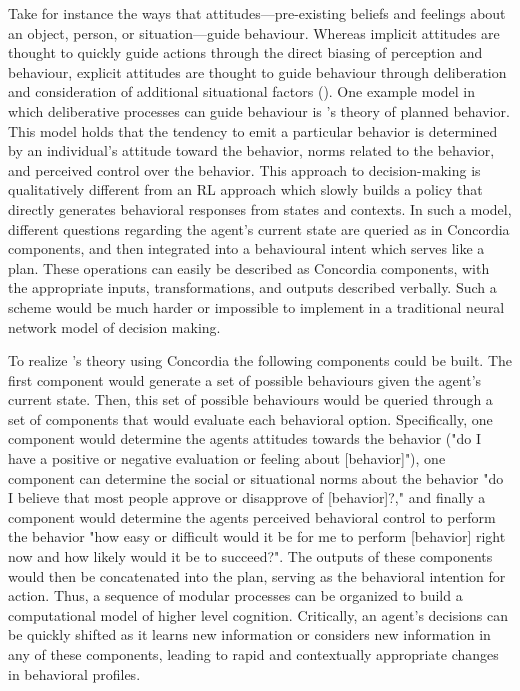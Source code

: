 \documentclass[11pt, a4paper, logo, twocolumn, internal, copyright, numbering]{googledeepmind}
\begin{document}
Take for instance the ways that attitudes---pre-existing beliefs and feelings about an object, person, or situation---guide behaviour. Whereas implicit attitudes are thought to quickly guide actions through the direct biasing of perception and behaviour, explicit attitudes are thought to guide behaviour through deliberation and consideration of additional situational factors (\cite{fazio1990multiple, gawronski2011associative, olson2008implicit}). One example model in which deliberative processes can guide behaviour is \cite{ajzen1991theory}'s theory of planned behavior. This model holds that the tendency to emit a particular behavior is determined by an individual's attitude toward the behavior, norms related to the behavior, and perceived control over the behavior. This approach to decision-making is qualitatively different from an RL approach which slowly builds a policy that directly generates behavioral responses from states and contexts. In such a model, different questions regarding the agent's current state are queried as in Concordia components, and then integrated into a behavioural intent which serves like a plan. These operations can easily be described as Concordia components, with the appropriate inputs, transformations, and outputs described verbally. Such a scheme would be much harder or impossible to implement in a traditional neural network model of decision making. 


To realize \cite{ajzen1991theory}'s theory using Concordia the following components could be built. The first component would generate a set of possible behaviours given the agent's current state. Then, this set of possible behaviours would be queried through a set of components that would evaluate each behavioral option. Specifically, one component would determine the agents attitudes towards the behavior ("do I have a positive or negative evaluation or feeling about [behavior]"), one component can determine the social or situational norms about the behavior "do I believe that most people approve or disapprove of [behavior]?," and finally a component would determine the agents perceived behavioral control to perform the behavior "how easy or difficult would it be for me to perform [behavior] right now and how likely would it be to succeed?". The outputs of these components would then be concatenated into the plan, serving as the behavioral intention for action. Thus, a sequence of modular processes can be organized to build a computational model of higher level cognition. Critically, an agent's decisions can be quickly shifted as it learns new information or considers new information in any of these components, leading to rapid and contextually appropriate changes in behavioral profiles.
\end{document}
